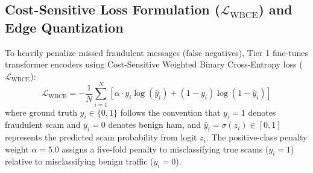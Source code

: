 \begin{table}[h]
\centering
\caption{Source Breakdown and Class Balance Across Corpus Partitions}
\label{tab:dataset_sources}
\renewcommand{\arraystretch}{0.92}
\end{table}

\subsection{Cost-Sensitive Loss Formulation ($\mathcal{L}_{\text{WBCE}}$) and Edge Quantization}
\label{subsec:wbce_quant}

To heavily penalize missed fraudulent messages (false negatives), Tier 1 fine-tunes transformer encoders using Cost-Sensitive Weighted Binary Cross-Entropy loss ($\mathcal{L}_{\text{WBCE}}$):
\begin{equation}
\label{eq:wbce}
\mathcal{L}_{\text{WBCE}} = -\frac{1}{N} \sum_{i=1}^{N} \left[ \alpha \cdot y_i \log(\hat{y}_i) + (1 - y_i) \log(1 - \hat{y}_i) \right]
\end{equation}
where ground truth $y_i \in \{0, 1\}$ follows the convention that $y_i = 1$ denotes fraudulent scam and $y_i = 0$ denotes benign ham, and $\hat{y}_i = \sigma(z_i) \in [0, 1]$ represents the predicted scam probability from logit $z_i$. The positive-class penalty weight $\alpha = 5.0$ assigns a five-fold penalty to misclassifying true scams ($y_i=1$) relative to misclassifying benign traffic ($y_i=0$). 

